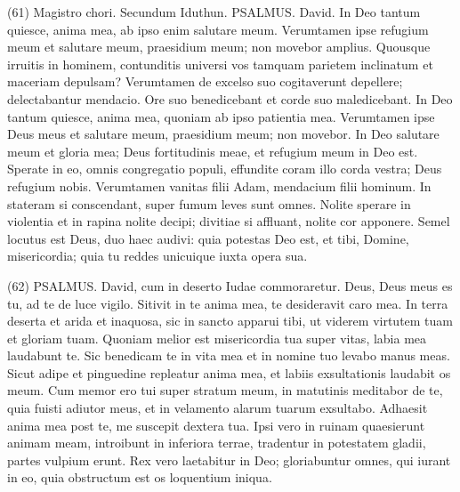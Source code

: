 \begin{biblechapter}  (61) 
\verse  Magistro chori. Secundum Iduthun. PSALMUS. David. 
\verse In Deo tantum quiesce, anima mea, ab ipso enim salutare meum. 
\verse Verumtamen ipse refugium meum et salutare meum, praesidium meum; non movebor amplius. 
\verse Quousque irruitis in hominem, contunditis universi vos tamquam parietem inclinatum et maceriam depulsam? 
\verse Verumtamen de excelso suo cogitaverunt depellere; delectabantur mendacio. Ore suo benedicebant et corde suo maledicebant. 
\verse In Deo tantum quiesce, anima mea, quoniam ab ipso patientia mea. 
\verse Verumtamen ipse Deus meus et salutare meum, praesidium meum; non movebor. 
\verse In Deo salutare meum et gloria mea; Deus fortitudinis meae, et refugium meum in Deo est. 
\verse Sperate in eo, omnis congregatio populi, effundite coram illo corda vestra; Deus refugium nobis. 
\verse Verumtamen vanitas filii Adam, mendacium filii hominum. In stateram si conscendant, super fumum leves sunt omnes. 
\verse Nolite sperare in violentia et in rapina nolite decipi; divitiae si affluant, nolite cor apponere. 
\verse Semel locutus est Deus, duo haec audivi: quia potestas Deo est, 
\verse et tibi, Domine, misericordia; quia tu reddes unicuique iuxta opera sua. 
\end{biblechapter}

\begin{biblechapter}  (62) 
\verse  PSALMUS. David, cum in deserto Iudae commoraretur. 
\verse Deus, Deus meus es tu, ad te de luce vigilo. Sitivit in te anima mea, te desideravit caro mea. In terra deserta et arida et inaquosa, 
\verse sic in sancto apparui tibi, ut viderem virtutem tuam et gloriam tuam. 
\verse Quoniam melior est misericordia tua super vitas, labia mea laudabunt te. 
\verse Sic benedicam te in vita mea et in nomine tuo levabo manus meas. 
\verse Sicut adipe et pinguedine repleatur anima mea, et labiis exsultationis laudabit os meum. 
\verse Cum memor ero tui super stratum meum, in matutinis meditabor de te, 
\verse quia fuisti adiutor meus, et in velamento alarum tuarum exsultabo. 
\verse Adhaesit anima mea post te, me suscepit dextera tua. 
\verse Ipsi vero in ruinam quaesierunt animam meam, introibunt in inferiora terrae, 
\verse tradentur in potestatem gladii, partes vulpium erunt. 
\verse Rex vero laetabitur in Deo; gloriabuntur omnes, qui iurant in eo, quia obstructum est os loquentium iniqua. 
\end{biblechapter}

